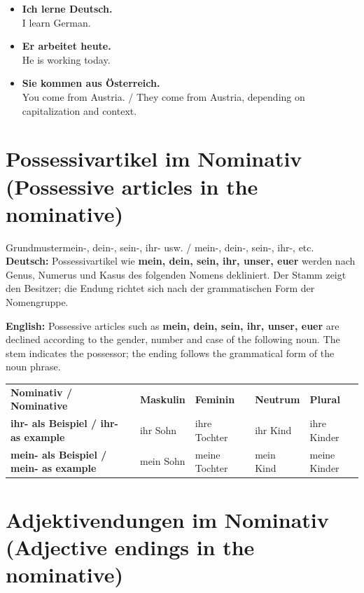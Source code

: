\documentclass[a4paper,11pt]{article}
\newcommand{\GermanText}[1]{\textbf{Deutsch: }#1\par}
\newcommand{\EnglishText}[1]{{\small\color{SoftGray}\textbf{English: }#1\par}}
\newcommand{\ExampleItem}[2]{\item \textbf{#1}\\{\small\color{SoftGray}#2}}
\begin{document}
\begin{exbox}
\begin{itemize}
\ExampleItem{Ich lerne Deutsch.}{I learn German.}
\ExampleItem{Er arbeitet heute.}{He is working today.}
\ExampleItem{Sie kommen aus Österreich.}{You come from Austria. / They come from Austria, depending on capitalization and context.}
\end{itemize}
\end{exbox}

\section{Possessivartikel im Nominativ \textnormal{(Possessive articles in the nominative)}}

\begin{grammarentry}{Grundmuster}{mein-, dein-, sein-, ihr- usw. / mein-, dein-, sein-, ihr-, etc.}
\GermanText{Possessivartikel wie \textbf{mein, dein, sein, ihr, unser, euer} werden nach Genus, Numerus und Kasus des folgenden Nomens dekliniert. Der Stamm zeigt den Besitzer; die Endung richtet sich nach der grammatischen Form der Nomengruppe.}
\EnglishText{Possessive articles such as \textbf{mein, dein, sein, ihr, unser, euer} are declined according to the gender, number and case of the following noun. The stem indicates the possessor; the ending follows the grammatical form of the noun phrase.}
\end{grammarentry}

\begin{longtable}{>{\bfseries}p{4.0cm}|>{\centering\arraybackslash}p{2.8cm}>{\centering\arraybackslash}p{2.8cm}>{\centering\arraybackslash}p{2.8cm}>{\centering\arraybackslash}p{2.8cm}}
\rowcolor{HeaderBlueDark}
\color{white}\textbf{Nominativ / Nominative} &
\color{white}\textbf{Maskulin} &
\color{white}\textbf{Feminin} &
\color{white}\textbf{Neutrum} &
\color{white}\textbf{Plural} \\
ihr- als Beispiel / ihr- as example & ihr Sohn & ihre Tochter & ihr Kind & ihre Kinder \\
mein- als Beispiel / mein- as example & mein Sohn & meine Tochter & mein Kind & meine Kinder \\
\end{longtable}

\section{Adjektivendungen im Nominativ \textnormal{(Adjective endings in the nominative)}}
\end{document}
